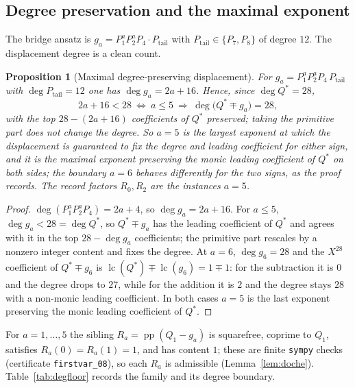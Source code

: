 \documentclass[11pt,reqno]{amsart}
\theoremstyle{plain}
\newtheorem{proposition}[theorem]{Proposition}
\theoremstyle{definition}
\theoremstyle{remark}
\DeclareMathOperator{\pp}{pp}
\begin{document}
\subsection*{Degree preservation and the maximal exponent}
The bridge ansatz is $g_a=P_1^aP_2^aP_4\cdot P_{\mathrm{tail}}$ with
$P_{\mathrm{tail}}\in\{P_7,P_8\}$ of degree $12$. The displacement degree is a clean
count.

\begin{proposition}[Maximal degree-preserving displacement]\label{prop:degfloor}
For $g_a=P_1^aP_2^aP_4\,P_{\mathrm{tail}}$ with $\deg P_{\mathrm{tail}}=12$ one has
$\deg g_a=2a+16$. Hence, since $\deg Q^*=28$,
\[
  2a+16<28\ \Longleftrightarrow\ a\le5\ \Longrightarrow\ \deg\bigl(Q^*\mp g_a\bigr)=28 ,
\]
with the top $28-(2a+16)$ coefficients of $Q^*$ preserved; taking the primitive part does
not change the degree. So $a=5$ is the largest exponent at which the displacement is
guaranteed to fix the degree and leading coefficient \emph{for either sign}, and it is
the maximal exponent preserving the \emph{monic leading coefficient} of $Q^*$ on both
sides; the boundary $a=6$ behaves differently for the two signs, as the proof records.
The record factors $R_0,R_2$ are the instances $a=5$.
\end{proposition}

\begin{proof}
$\deg(P_1^aP_2^aP_4)=2a+4$, so $\deg g_a=2a+16$. For $a\le5$, $\deg g_a<28=\deg Q^*$, so
$Q^*\mp g_a$ has the leading coefficient of $Q^*$ and agrees with it in the top
$28-\deg g_a$ coefficients; the primitive part rescales by a nonzero integer content and
fixes the degree. At $a=6$, $\deg g_6=28$ and the $X^{28}$ coefficient of $Q^*\mp g_6$ is
$\operatorname{lc}(Q^*)\mp\operatorname{lc}(g_6)=1\mp1$: for the subtraction it is $0$ and
the degree drops to $27$, while for the addition it is $2$ and the degree stays $28$ with
a non-monic leading coefficient. In both cases $a=5$ is the last exponent preserving the
monic leading coefficient of $Q^*$.
\end{proof}

For $a=1,\dots,5$ the sibling $R_a=\pp(Q_1-g_a)$ is squarefree, coprime to $Q_1$,
satisfies $R_a(0)=R_a(1)=1$, and has content $1$; these are finite \texttt{sympy} checks
(certificate \texttt{firstvar\_08}), so each $R_a$ is admissible
(Lemma~\ref{lem:doche}). Table~\ref{tab:degfloor} records the family and its degree
boundary.
\end{document}
